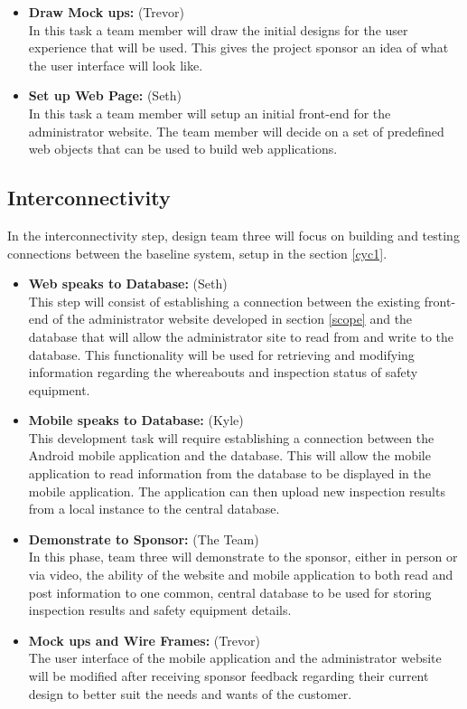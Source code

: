 \documentclass[Letter,11pt]{article}
\begin{document}
\begin{itemize}
			\item\textbf{Draw Mock ups:} (Trevor)\\
			In this task a team member will draw the initial designs for the user experience that will be used. This gives the project sponsor an idea of what the user interface will look like. 
			\item\textbf{Set up Web Page:} (Seth)\\
			In this task a team member will setup an initial front-end for the administrator website. The team member will decide on a set of predefined web objects that can be used to build web applications.
		\end{itemize}
		
		
		
	\subsection{Interconnectivity}\label{connect}
		In the interconnectivity step, design team three will focus on building and testing connections between the baseline system, setup in the section \ref{cyc1}.
		\begin{itemize}
			\item\textbf{Web speaks to Database:} (Seth)\\
			This step will consist of establishing a connection between the existing front-end of the administrator website developed in section \ref{scope} and the database that will allow the administrator site to read from and write to the database. This functionality will be used for retrieving and modifying information regarding the whereabouts and inspection status of safety equipment. 
			\item \textbf{Mobile speaks to Database:} (Kyle)\\
			This development task will require establishing a connection between the Android mobile application and the database. This will allow the mobile application to read information from the database to be displayed in the mobile application. The application can then upload new inspection results from a local instance to the central database.
			\item\textbf{Demonstrate to Sponsor:} (The Team)\\
			 In this phase, team three will demonstrate to the sponsor, either in person or via video, the ability of the website and mobile application to both read and post information to one common, central database to be used for storing inspection results and safety equipment details.
			\item\textbf{Mock ups and Wire Frames:} (Trevor)\\
			The user interface of the mobile application and the administrator website will be modified after receiving sponsor feedback regarding their current design to better suit the needs and wants of the customer.
		\end{itemize}
		
\end{document}
